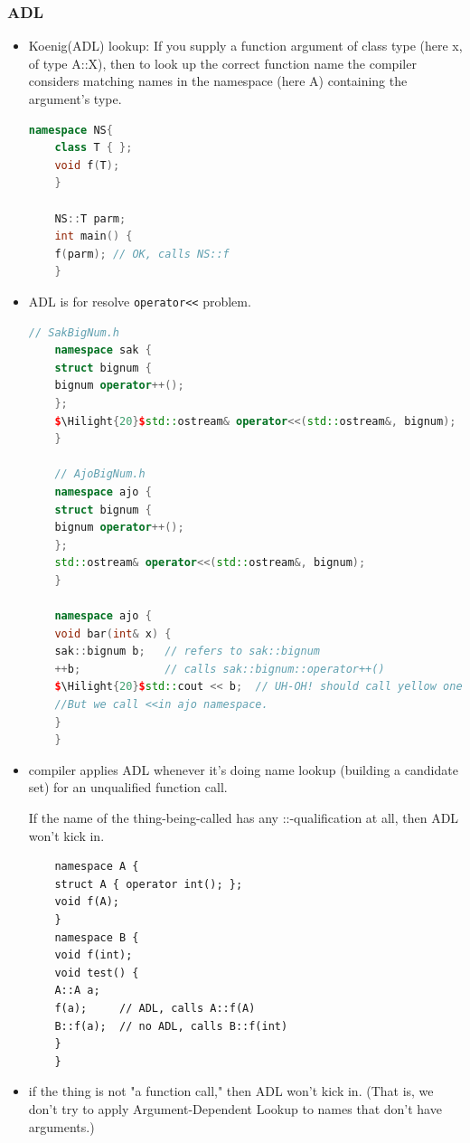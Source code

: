 \documentclass[a4paper,11pt,twoside]{book}
\newcommand{\Hilight}[1]{\makebox[0pt][l]{\color{yellow}\rule[-3pt]{#1em}{11pt}}}
\newcommand{\Hilight}[1]{}
\begin{document}
\subsubsection{ADL}
\begin{itemize}
	\item Koenig(ADL) lookup: If you supply a function argument of class type (here x, of type A::X), then to look up the correct function name the compiler considers matching names in the namespace (here A) containing the argument's type.
	
	\begin{lstlisting}[frame=single, language=c++]
	namespace NS{
	class T { };
	void f(T);
	}
	
	NS::T parm;
	int main() {
	f(parm); // OK, calls NS::f
	}
	\end{lstlisting}
	
	\item ADL is for resolve \texttt{operator<<} problem.
	\begin{lstlisting}[frame=single, language=c++]
	// SakBigNum.h
	namespace sak {
	struct bignum {
	bignum operator++();
	};
	$\Hilight{20}$std::ostream& operator<<(std::ostream&, bignum); 
	}
	
	// AjoBigNum.h
	namespace ajo {
	struct bignum {
	bignum operator++();
	};
	std::ostream& operator<<(std::ostream&, bignum);
	}
	
	namespace ajo {
	void bar(int& x) {
	sak::bignum b;   // refers to sak::bignum
	++b;             // calls sak::bignum::operator++()
	$\Hilight{20}$std::cout << b;  // UH-OH! should call yellow one
	//But we call <<in ajo namespace.
	}
	}
	\end{lstlisting}
	
	\item compiler applies ADL whenever it's doing name lookup (building a candidate set) for an unqualified function call.
	
	If the name of the thing-being-called has any ::-qualification at all, then ADL won't kick in.
	
	\begin{lstlisting}
	namespace A {
	struct A { operator int(); };
	void f(A);
	}
	namespace B {
	void f(int);
	void test() {
	A::A a;
	f(a);     // ADL, calls A::f(A)
	B::f(a);  // no ADL, calls B::f(int)
	}
	}
	\end{lstlisting}
	
	\item  if the thing is not "a function call," then ADL won't kick in. (That is, we don't try to apply Argument-Dependent Lookup to names that don't have arguments.) 
	

\end{itemize}
\end{document}
